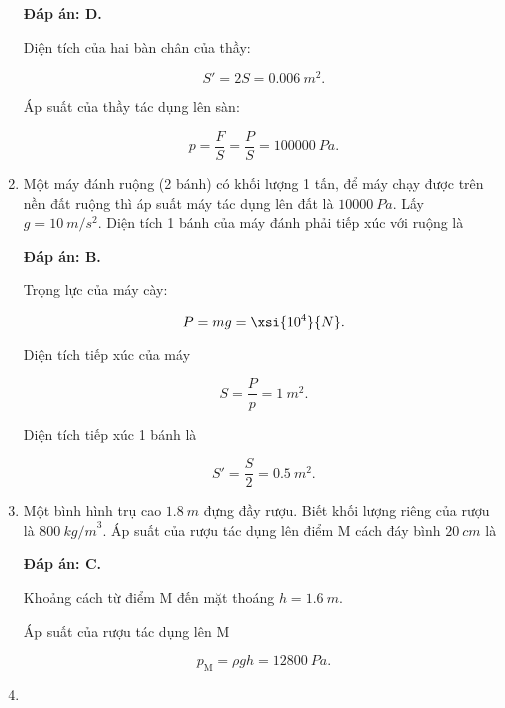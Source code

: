 \begin{enumerate}[label=\bfseries Câu \arabic*:]
	\hideall
	{	
		\textbf{Đáp án: D.}
		
		Diện tích của hai bàn chân của thầy:
		
		$$S'=2S = \SI{0,006}{m^2}.$$
		
		Áp suất của thầy tác dụng lên sàn:
		
		$$p = \dfrac{F}{S} = \dfrac{P}{S} = \SI{100000}{Pa}.$$
	}
	\item {}
	
	
	{
		Một máy đánh ruộng (2 bánh) có khối lượng 1 tấn, để máy chạy được trên nền đất ruộng thì áp suất máy tác dụng lên đất là $\SI{10000}{Pa}$. Lấy $g= \SI{10}{m/s^2}.$ Diện tích 1 bánh của máy đánh phải tiếp xúc với ruộng là
	}
	
	\hideall
	{	
		\textbf{Đáp án: B.}
		
		Trọng lực của máy cày:
		
		$$P = mg = \xsi{10^4}{N}.$$
		
		Diện tích tiếp xúc của máy
		
		$$S = \dfrac{P}{p} = \SI{1}{m^2}.$$
		
		Diện tích tiếp xúc 1 bánh là
		
		$$S' = \dfrac{S}{2} = \SI{0,5}{m^2}.$$
	}
	\item {}
	
	
	{
		Một bình hình trụ cao $\SI{1,8}{m}$ đựng đầy rượu. Biết khối lượng riêng của rượu là $\SI{800}{kg/m}^3$. Áp suất của rượu tác dụng lên điểm M cách đáy bình $\SI{20}{cm}$ là
	}
	
	\hideall
	{	
		\textbf{Đáp án: C.}
		
		Khoảng cách từ điểm M đến mặt thoáng $h = \SI{1,6}{m}.$
		
		Áp suất của rượu tác dụng lên M
		
		$$ p_\text{M} = \rho g h =\SI{12800}{Pa}.$$
	}
	\item {}
	

\end{enumerate}
